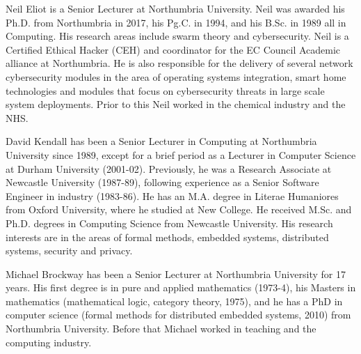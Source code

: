 \documentclass{ieeeaccess}
\begin{document}



\begin{IEEEbiography}{Neil
  Eliot} is a Senior Lecturer at Northumbria University.  Neil was awarded his
  Ph.D. from Northumbria in 2017, his Pg.C. in 1994, and his B.Sc. in 1989 all
  in Computing. His research areas include swarm theory and cybersecurity. Neil
  is a Certified Ethical Hacker (CEH) and coordinator for the EC Council
  Academic alliance at Northumbria. He is also responsible for the delivery of
  several network cybersecurity modules in the area of operating systems
  integration, smart home technologies and modules that focus on cybersecurity
  threats in large scale system deployments. Prior to this Neil worked in the
  chemical industry and the NHS.  \end{IEEEbiography}

\begin{IEEEbiography}{David
  Kendall} has been a Senior Lecturer in Computing at Northumbria University
  since 1989, except for a brief period as a Lecturer in Computer Science at
  Durham University (2001-02). Previously, he was a Research Associate at
  Newcastle University (1987-89), following experience as a Senior Software
  Engineer in industry (1983-86). He has an M.A. degree in Literae Humaniores
  from Oxford University, where he studied at New College. He received M.Sc.
  and Ph.D. degrees in Computing Science from Newcastle University. His
  research interests are in the areas of formal methods, embedded systems,
  distributed systems, security and privacy. \end{IEEEbiography}

\begin{IEEEbiography}{Michael
  Brockway} has been a Senior Lecturer at Northumbria University for 17 years.
  His first degree is in pure and applied mathematics (1973-4), his Masters in
  mathematics (mathematical logic, category theory, 1975), and he has a PhD in
  computer science (formal methods for distributed embedded systems, 2010) from
  Northumbria University. Before that Michael worked in teaching and the
  computing industry.  \end{IEEEbiography}

\EOD
\end{document}
